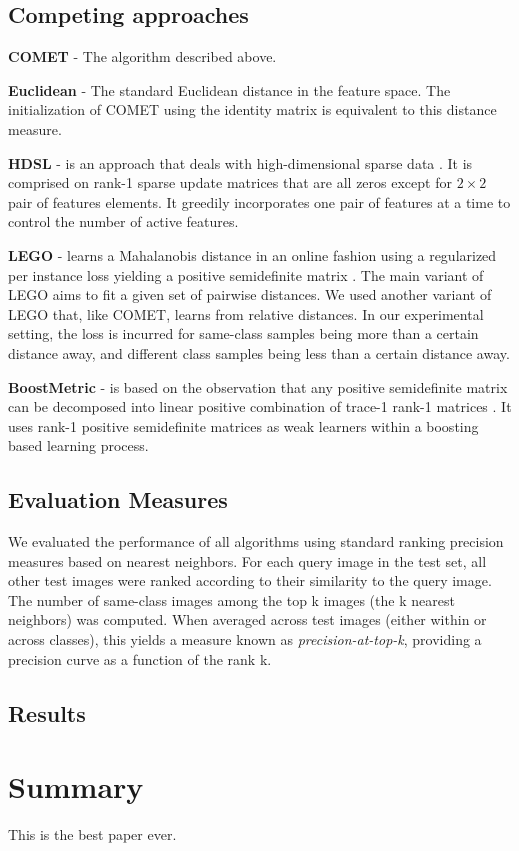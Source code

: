 \documentclass{article}
\begin{document}

\subsection{Competing approaches}
\textbf{COMET} - The algorithm described above.

\textbf{Euclidean} - The standard Euclidean distance in the feature space. The initialization of COMET using the identity matrix is equivalent to this distance measure.

\textbf{HDSL} - is an approach that deals with high-dimensional sparse data \cite{hdsl}. It is comprised on rank-1 sparse update matrices that are all zeros except for $2\times2$ pair of features elements. It greedily incorporates one pair of features at a time to control the number of active features.

\textbf{LEGO} - learns a Mahalanobis distance in an online fashion using a regularized per instance loss yielding a positive semidefinite matrix \cite{lego}. The main variant of LEGO aims to fit a given set of pairwise distances. We used another variant of LEGO that, like COMET, learns from relative distances. In our experimental setting, the loss is incurred for same-class samples being more than a certain distance away, and different class samples being less than a certain distance away.

\textbf{BoostMetric} - is based on the observation that any positive semidefinite matrix can be decomposed into linear positive combination of trace-1 rank-1 matrices  \cite{boost}. It uses rank-1 positive semidefinite matrices as weak learners within a boosting based learning process.


\subsection{Evaluation Measures}
We evaluated the performance of all algorithms using standard ranking precision measures
based on nearest neighbors. For each query image in the test set, all other test images were
ranked according to their similarity to the query image. The number of same-class images
among the top k images (the k nearest neighbors) was computed. When averaged across test
images (either within or across classes), this yields a measure known as \textit{precision-at-top-k},
providing a precision curve as a function of the rank k.



\subsection{Results}


\section{Summary}
This is the best paper ever.






\end{document}
